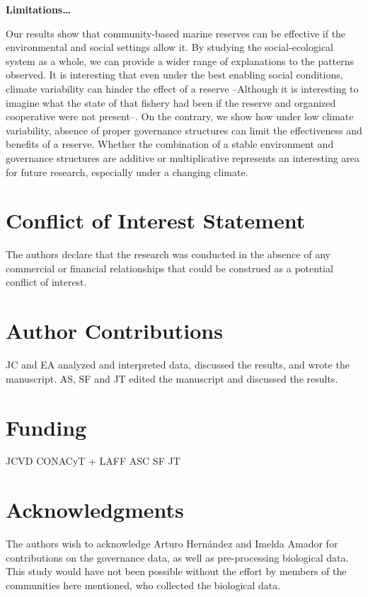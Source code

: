 \documentclass{frontiersSCNS}
\theoremstyle{definition}
\theoremstyle{definition}
\theoremstyle{definition}
\theoremstyle{remark}
\begin{document}
\textbf{Limitations\ldots{}}

Our results show that community-based marine reserves can be effective
if the environmental and social settings allow it. By studying the
social-ecological system as a whole, we can provide a wider range of
explanations to the patterns observed. It is interesting that even under
the best enabling social conditions, climate variability can hinder the
effect of a reserve --Although it is interesting to imagine what the
state of that fishery had been if the reserve and organized cooperative
were not present--. On the contrary, we show how under low climate
variability, absence of proper governance structures can limit the
effectiveness and benefits of a reserve. Whether the combination of a
stable environment and governance structures are additive or
multiplicative represents an interesting area for future research,
especially under a changing climate.

\section*{Conflict of Interest Statement}

The authors declare that the research was conducted in the absence of
any commercial or financial relationships that could be construed as a
potential conflict of interest.

\section*{Author Contributions}

JC and EA analyzed and interpreted data, discussed the results, and
wrote the manuscript. AS, SF and JT edited the manuscript and discussed
the results.

\section*{Funding}

JCVD CONACyT + LAFF ASC SF JT

\section*{Acknowledgments}

The authors wish to acknowledge Arturo Hernández and Imelda Amador for
contributions on the governance data, as well as pre-processing
biological data. This study would have not been possible without the
effort by members of the communities here mentioned, who collected the
biological data.
\end{document}
